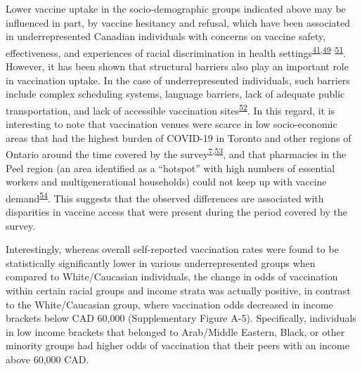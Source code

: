 \documentclass[
]{article}
\begin{document}
Lower vaccine uptake in the socio-demographic groups indicated above may
be influenced in part, by vaccine hesitancy and refusal, which have been
associated in underrepresented Canadian individuals with concerns on
vaccine safety, effectiveness, and experiences of racial discrimination
in health
settings\textsuperscript{\protect\hyperlink{ref-cnat2022a}{41},\protect\hyperlink{ref-basta2022}{49}--\protect\hyperlink{ref-cnat2023}{51}}.
However, it has been shown that structural barriers also play an
important role in vaccination uptake. In the case of underrepresented
individuals, such barriers include complex scheduling systems, language
barriers, lack of adequate public transportation, and lack of accessible
vaccination
sites\textsuperscript{\protect\hyperlink{ref-njoku2021}{52}}. In this
regard, it is interesting to note that vaccination venues were scarce in
low socio-economic areas that had the highest burden of COVID-19 in
Toronto and other regions of Ontario around the time covered by the
survey\textsuperscript{\protect\hyperlink{ref-bogoch2022}{7},\protect\hyperlink{ref-iveniuk2021}{53}},
and that pharmacies in the Peel region (an area identified as a
``hotspot'' with high numbers of essential workers and multigenerational
households) could not keep up with vaccine
demand\textsuperscript{\protect\hyperlink{ref-gill2022}{54}}. This
suggests that the observed differences are associated with disparities
in vaccine access that were present during the period covered by the
survey.

Interestingly, whereas overall self-reported vaccination rates were
found to be statistically significantly lower in various
underrepresented groups when compared to White/Caucasian individuals,
the change in odds of vaccination within certain racial groups and
income strata was actually positive, in contrast to the White/Caucasian
group, where vaccination odds decreased in income brackets below CAD
60,000 (Supplementary Figure A-5). Specifically, individuals in low
income brackets that belonged to Arab/Middle Eastern, Black, or other
minority groups had higher odds of vaccination that their peers with an
income above 60,000 CAD.
\end{document}
